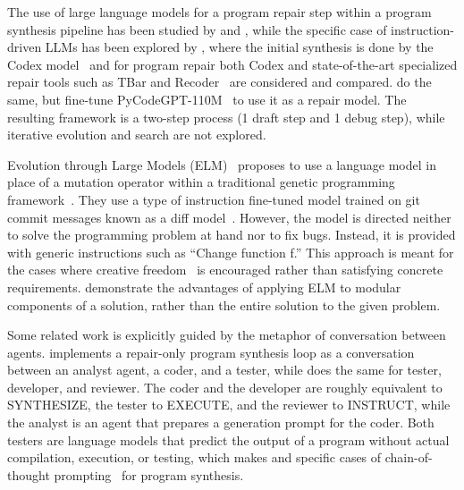 The use of large language models for a program repair step within a program synthesis pipeline has been studied by \cite{joshi2022:repair} and \cite{guptaSynthesizeExecuteDebug2020}, 
while the specific case of instruction-driven LLMs has been explored by \cite{fanAutomatedRepairPrograms2023}, where the initial synthesis is done by the Codex model~\cite{chenEvaluatingLargeLanguage2021} and for program repair both Codex and state-of-the-art specialized repair tools such as TBar and Recoder~\cite{justDefects4JDatabaseExisting2014} are considered and compared. 
\cite{zhangSelfEditFaultAwareCode2023} do the same, but fine-tune PyCodeGPT-110M~\cite{zanCERTContinualPretraining2022} to use it as a repair model. 
The resulting framework is a two-step process (1 draft step and 1 debug step), while iterative evolution and search are not explored. 

Evolution through Large Models (ELM)~\cite{lehmanEvolutionLargeModels2022} proposes to use a language model in place of a mutation operator within a traditional genetic programming framework~\cite{koza1994:genetic}. They use a type of instruction fine-tuned model trained on git commit messages known as a diff model~\cite{DiffModelsNew2023}.
However, the model is directed neither to solve the programming problem at hand nor to fix bugs.
Instead, it is provided with generic instructions such as ``Change function f.'' 
This approach is meant for the cases where creative freedom~\cite{stanleyWhyGreatnessCannot2015a} is encouraged rather than satisfying concrete requirements.
\cite{liu2023algorithm} demonstrate the advantages of applying ELM to modular components of a solution, rather than the entire solution to the given problem.

Some related work is explicitly guided by the metaphor of conversation between agents. 
\cite{zhang2023steam} implements a repair-only program synthesis loop as a conversation between an analyst agent, a coder, and a tester, while \cite{dongSelfcollaborationCodeGeneration2023} does the same for tester, developer, and reviewer. 
The coder and the developer are roughly equivalent to SYNTHESIZE, the tester to EXECUTE, and the reviewer to INSTRUCT, while the analyst is an agent that prepares a generation prompt for the coder. 
Both testers are language models that predict the output of a program without actual compilation, execution, or testing, which makes \cite{dongSelfcollaborationCodeGeneration2023} and \cite{zhang2023steam} specific cases of chain-of-thought prompting~\cite{yuBetterChainofThoughtPrompting2023} for program synthesis.

